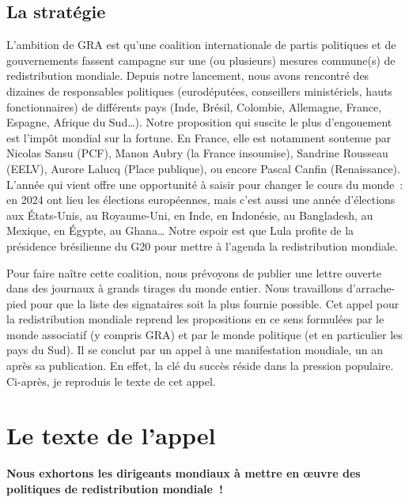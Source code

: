 \documentclass[a5paper,french,openany]{memoir}
\begin{document}
\subsection{La stratégie}

L'ambition de GRA est qu'une coalition internationale de partis politiques et de gouvernements fassent campagne sur une (ou plusieurs) mesures commune(s) de redistribution mondiale. Depuis notre lancement, nous avons rencontré des dizaines de responsables politiques (eurodéputé\textperiodcentered{}e\textperiodcentered{}s, conseillers ministériels, hauts fonctionnaires) de différents pays (Inde, Brésil, Colombie, Allemagne, France, Espagne, Afrique du Sud\dots). Notre proposition qui suscite le plus d'engouement est l'impôt mondial sur la fortune. En France, elle est notamment soutenue par Nicolas Sansu (PCF), Manon Aubry (la France insoumise), Sandrine Rousseau (EELV), Aurore Lalucq (Place publique), ou encore Pascal Canfin (Renaissance). L'année qui vient offre une opportunité à saisir pour changer le cours du monde~: en 2024 ont lieu les élections européennes, mais c'est aussi une année d'élections aux États-Unis, au Royaume-Uni, en Inde, en Indonésie, au Bangladesh, au Mexique, en Égypte, au Ghana\dots{} Notre espoir est que Lula profite de la présidence brésilienne du G20 pour mettre à l'agenda la redistribution mondiale. 

Pour faire naître cette coalition, nous prévoyons de publier une lettre ouverte dans des journaux à grands tirages du monde entier. Nous travaillons d'arrache-pied pour que la liste des signataires soit la plus fournie possible. Cet appel pour la redistribution mondiale reprend les propositions en ce sens formulées par le monde  associatif (y compris GRA) et par le monde politique (et en particulier les pays du Sud). Il se conclut par un appel à une manifestation mondiale, un an après sa publication. En effet, la clé du succès réside dans la pression populaire. Ci-après, je reproduis le texte de cet appel.%

\section{Le texte de l'appel}

\begin{center}
\textbf{Nous exhortons les dirigeants mondiaux à mettre en œuvre des politiques de redistribution mondiale~!}
\end{center}
\end{document}
